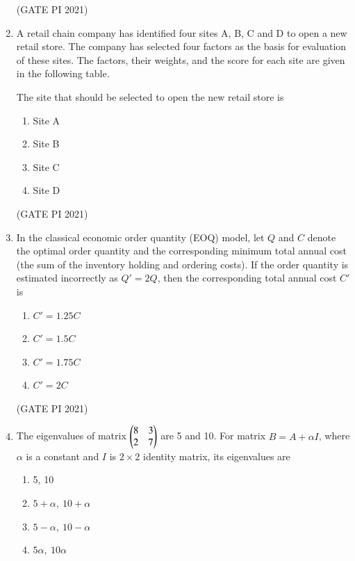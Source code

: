 \documentclass[journal,12pt,onecolumn]{IEEEtran}
\theoremstyle{remark}
\begin{document}
\begin{enumerate}
\hfill (GATE PI 2021)

\item
A retail chain company has identified four sites A, B, C and D to open a new retail store. The company has selected four factors as the basis for evaluation of these sites. The factors, their weights, and the score for each site are given in the following table.




The site that should be selected to open the new retail store is

\begin{multicols}{4}
\begin{enumerate}
\item Site A
\item Site B
\item Site C
\item Site D
\end{enumerate}
\end{multicols}

\hfill (GATE PI 2021)

\item
In the classical economic order quantity (EOQ) model, let $Q$ and $C$ denote the optimal order quantity and the corresponding minimum total annual cost (the sum of the inventory holding and ordering costs). If the order quantity is estimated incorrectly as $Q' = 2Q$, then the corresponding total annual cost $C'$ is

\begin{multicols}{4}
\begin{enumerate}
\item $C' = 1.25C$
\item $C' = 1.5C$
\item $C' = 1.75C$
\item $C' = 2C$
\end{enumerate}
\end{multicols}

\hfill (GATE PI 2021)

\item
The eigenvalues of matrix 
$
\begin{pmatrix}
8 & 3\\
2 & 7
\end{pmatrix}
$
are 5 and 10. For matrix $B = A + \alpha I$, where $\alpha$ is a constant and $I$ is $2 \times 2$ identity matrix, its eigenvalues are

\begin{multicols}{4}
\begin{enumerate}
\item 5, 10
\item $5 + \alpha,\ 10 + \alpha$
\item $5 - \alpha,\ 10 - \alpha$
\item $5\alpha,\ 10\alpha$
\end{enumerate}
\end{multicols}


\end{enumerate}
\end{document}

